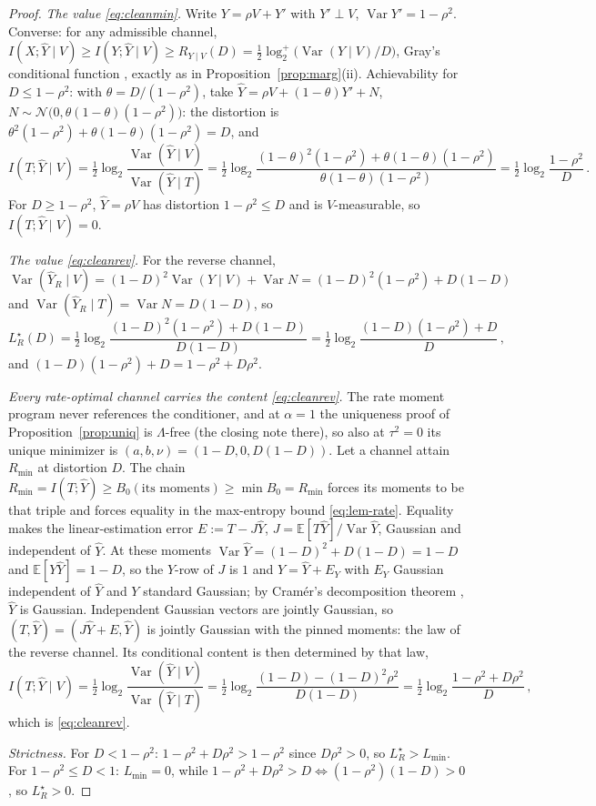 ﻿\documentclass[11pt,onecolumn]{IEEEtran}
\newcommand{\E}{\mathbb{E}}
\newcommand{\hY}{\widehat{Y}}
\newcommand{\LRs}{L_{R}^{\star}}
\begin{document}
\begin{proof}
\emph{The value \eqref{eq:cleanmin}.} Write $Y=\rho V+Y'$ with
$Y'\perp V$, $\operatorname{Var}Y'=1-\rho^2$. Converse: for any
admissible channel, $I(X;\hY\mid V)\ge I(Y;\hY\mid V)\ge R_{Y\mid
V}(D)=\tfrac12\log_2^{+}\bigl(\operatorname{Var}(Y\mid
V)/D\bigr)$, Gray's conditional function \cite{gray1973}, exactly as
in Proposition~\ref{prop:marg}(ii). Achievability for $D\le1-\rho^2$:
with $\theta=D/(1-\rho^2)$, take
$\hY=\rho V+(1-\theta)Y'+N$, $N\sim\mathcal
N\bigl(0,\theta(1-\theta)(1-\rho^2)\bigr)$: the distortion is
$\theta^2(1-\rho^2)+\theta(1-\theta)(1-\rho^2)=D$, and
\[
I(T;\hY\mid V)
=\tfrac12\log_2
\frac{\operatorname{Var}(\hY\mid V)}{\operatorname{Var}(\hY\mid T)}
=\tfrac12\log_2
\frac{(1-\theta)^2(1-\rho^2)+\theta(1-\theta)(1-\rho^2)}
{\theta(1-\theta)(1-\rho^2)}
=\tfrac12\log_2\frac{1-\rho^2}{D}\,.
\]
For $D\ge1-\rho^2$, $\hY=\rho V$ has distortion $1-\rho^2\le D$ and is
$V$-measurable, so $I(T;\hY\mid V)=0$.

\emph{The value \eqref{eq:cleanrev}.} For the reverse channel,
$\operatorname{Var}(\hY_R\mid V)=(1-D)^2\operatorname{Var}(Y\mid
V)+\operatorname{Var}N=(1-D)^2(1-\rho^2)+D(1-D)$ and
$\operatorname{Var}(\hY_R\mid T)=\operatorname{Var}N=D(1-D)$, so
\[
\LRs(D)=\tfrac12\log_2
\frac{(1-D)^2(1-\rho^2)+D(1-D)}{D(1-D)}
=\tfrac12\log_2\frac{(1-D)(1-\rho^2)+D}{D}\,,
\]
and $(1-D)(1-\rho^2)+D=1-\rho^2+D\rho^2$.

\emph{Every rate-optimal channel carries the content
\eqref{eq:cleanrev}.} The rate moment program never references the
conditioner, and at $\alpha=1$ the uniqueness proof of
Proposition~\ref{prop:uniq} is $\Lambda$-free (the closing note
there), so also at $\tau^2=0$ its unique minimizer is
$(a,b,\nu)=(1-D,0,D(1-D))$. Let a channel attain $R_{\min}$ at
distortion $D$. The chain
$R_{\min}=I(T;\hY)\ge B_0(\text{its moments})\ge\min B_0=R_{\min}$
forces its moments to be that triple and forces equality in the
max-entropy bound \eqref{eq:lem-rate}. Equality makes the
linear-estimation error $E:=T-J\hY$,
$J=\E[T\hY]/\operatorname{Var}\hY$, Gaussian and independent of
$\hY$. At these moments $\operatorname{Var}\hY=(1-D)^2+D(1-D)=1-D$
and $\E[Y\hY]=1-D$, so the $Y$-row of $J$ is $1$ and
$Y=\hY+E_Y$ with $E_Y$ Gaussian independent of $\hY$ and $Y$ standard
Gaussian; by Cram\'er's decomposition theorem \cite{cramer1936},
$\hY$ is Gaussian. Independent Gaussian vectors are jointly Gaussian,
so $(T,\hY)=(J\hY+E,\hY)$ is jointly Gaussian with the pinned
moments: the law of the reverse channel. Its conditional content is
then determined by that law,
\[
I(T;\hY\mid V)
=\tfrac12\log_2
\frac{\operatorname{Var}(\hY\mid V)}{\operatorname{Var}(\hY\mid T)}
=\tfrac12\log_2\frac{(1-D)-(1-D)^2\rho^2}{D(1-D)}
=\tfrac12\log_2\frac{1-\rho^2+D\rho^2}{D}\,,
\]
which is \eqref{eq:cleanrev}.

\emph{Strictness.} For $D<1-\rho^2$:
$1-\rho^2+D\rho^2>1-\rho^2$ since $D\rho^2>0$, so $\LRs>L_{\min}$. For
$1-\rho^2\le D<1$: $L_{\min}=0$, while
$1-\rho^2+D\rho^2>D\Leftrightarrow(1-\rho^2)(1-D)>0$, so $\LRs>0$.
\end{proof}
\end{document}
